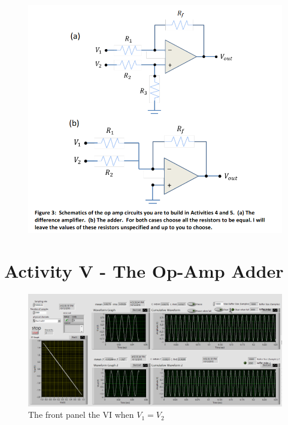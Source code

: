 \documentclass[11pt]{article}
\begin{document}
\begin{figure}[H]
 \begin{center}
  \includegraphics[width=\linewidth/1]{act4and5}
  \caption{}
  \label{fig:act4and5}
 \end{center}
\end{figure}

\section{Activity V - The Op-Amp Adder}

\begin{figure}[H]
 \begin{center}
  \includegraphics[width=\linewidth/1]{act5AC_V1eqV2}
  \caption{The front panel the VI when $V_{1}=V_{2}$}
  \label{fig:act5AC_V1eqV2}
 \end{center}
\end{figure}
\end{document}
